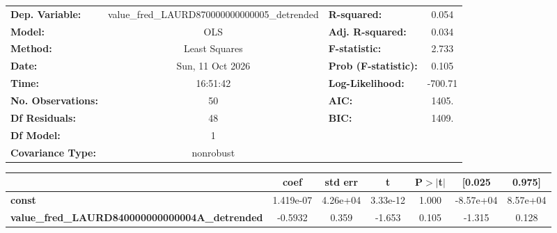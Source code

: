 \begin{center}
\begin{tabular}{lclc}
\toprule
\textbf{Dep. Variable:}                                & value\_fred\_LAURD870000000000005\_detrended & \textbf{  R-squared:         } &     0.054   \\
\textbf{Model:}                                        &                     OLS                      & \textbf{  Adj. R-squared:    } &     0.034   \\
\textbf{Method:}                                       &                Least Squares                 & \textbf{  F-statistic:       } &     2.733   \\
\textbf{Date:}                                         &               Sun, 11 Oct 2026               & \textbf{  Prob (F-statistic):} &    0.105    \\
\textbf{Time:}                                         &                   16:51:42                   & \textbf{  Log-Likelihood:    } &   -700.71   \\
\textbf{No. Observations:}                             &                        50                    & \textbf{  AIC:               } &     1405.   \\
\textbf{Df Residuals:}                                 &                        48                    & \textbf{  BIC:               } &     1409.   \\
\textbf{Df Model:}                                     &                         1                    & \textbf{                     } &             \\
\textbf{Covariance Type:}                              &                  nonrobust                   & \textbf{                     } &             \\
\bottomrule
\end{tabular}
\begin{tabular}{lcccccc}
                                                       & \textbf{coef} & \textbf{std err} & \textbf{t} & \textbf{P$> |$t$|$} & \textbf{[0.025} & \textbf{0.975]}  \\
\midrule
\textbf{const}                                         &    1.419e-07  &     4.26e+04     &  3.33e-12  &         1.000        &    -8.57e+04    &     8.57e+04     \\
\textbf{value\_fred\_LAURD840000000000004A\_detrended} &      -0.5932  &        0.359     &    -1.653  &         0.105        &       -1.315    &        0.128     \\

\end{tabular}
\end{center}
